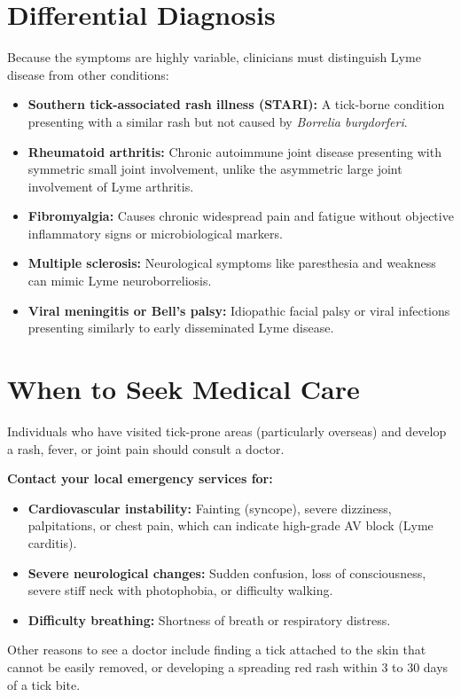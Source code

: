 \section*{Differential Diagnosis}
Because the symptoms are highly variable, clinicians must distinguish Lyme disease from other conditions:
\begin{itemize}
    \item \textbf{Southern tick-associated rash illness (STARI):} A tick-borne condition presenting with a similar rash but not caused by \textit{Borrelia burgdorferi}.
    \item \textbf{Rheumatoid arthritis:} Chronic autoimmune joint disease presenting with symmetric small joint involvement, unlike the asymmetric large joint involvement of Lyme arthritis.
    \item \textbf{Fibromyalgia:} Causes chronic widespread pain and fatigue without objective inflammatory signs or microbiological markers.
    \item \textbf{Multiple sclerosis:} Neurological symptoms like paresthesia and weakness can mimic Lyme neuroborreliosis.
    \item \textbf{Viral meningitis or Bell's palsy:} Idiopathic facial palsy or viral infections presenting similarly to early disseminated Lyme disease.
\end{itemize}

\section*{When to Seek Medical Care}
Individuals who have visited tick-prone areas (particularly overseas) and develop a rash, fever, or joint pain should consult a doctor.

\textbf{Contact your local emergency services for:}
\begin{itemize}
    \item \textbf{Cardiovascular instability:} Fainting (syncope), severe dizziness, palpitations, or chest pain, which can indicate high-grade AV block (Lyme carditis).
    \item \textbf{Severe neurological changes:} Sudden confusion, loss of consciousness, severe stiff neck with photophobia, or difficulty walking.
    \item \textbf{Difficulty breathing:} Shortness of breath or respiratory distress.
\end{itemize}
Other reasons to see a doctor include finding a tick attached to the skin that cannot be easily removed, or developing a spreading red rash within 3 to 30 days of a tick bite.

